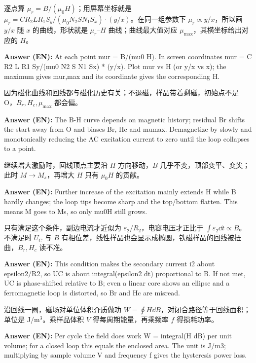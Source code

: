 \documentclass[11pt]{ctexart}
\begin{document}
逐点算 \(\mu_r=B/(\mu_0H)\)；用屏幕坐标就是 \(\mu_r=CR_2LR_1S_y/(\mu_0N_2SN_1S_x)\cdot(y/x)\)。在同一组参数下 \(\mu_r\propto y/x\)，所以画 \(y/x\) 随 \(x\) 的曲线，形状就是 \(\mu_r\)--\(H\) 曲线；曲线最大值对应 \(\mu_{\max}\)，其横坐标给出对应的 \(H\)。


\textbf{Answer (EN):} At each point mur = B/(mu0 H). In screen coordinates mur = C R2 L R1 Sy/(mu0 N2 S N1 Sx) * (y/x). Plot mur vs H (or y/x vs x); the maximum gives mur,max and its coordinate gives the corresponding H.

因为磁化曲线和回线都与磁化历史有关；不退磁，样品带着剩磁，初始点不是 O，\(B_r,H_c,\mu_{\max}\) 都会偏。

\textbf{Answer (EN):} The B-H curve depends on magnetic history; residual Br shifts the start away from O and biases Br, Hc and mumax. Demagnetize by slowly and monotonically reducing the AC excitation current to zero until the loop collapses to a point.

继续增大激励时，回线顶点主要沿 \(H\) 方向移动，\(B\) 几乎不变，顶部变平、变尖；此时 \(M\to M_s\)，再增大 \(H\) 只有 \(\mu_0H\) 的贡献。

\textbf{Answer (EN):} Further increase of the excitation mainly extends H while B hardly changes; the loop tips become sharp and the top/bottom flatten. This means M goes to Ms, so only mu0H still grows.

只有满足这个条件，副边电流才近似为 \(\varepsilon_2/R_2\)，电容电压才正比于 \(\int\varepsilon_2\dd t\propto B\)。不满足时 \(U_C\) 与 \(B\) 有相位差，线性样品也会显示成椭圆，铁磁样品的回线被扭曲，\(B_r,H_c\) 读不准。

\textbf{Answer (EN):} This condition makes the secondary current i2 about epsilon2/R2, so UC is about integral(epsilon2 dt) proportional to B. If not met, UC is phase-shifted relative to B; even a linear core shows an ellipse and a ferromagnetic loop is distorted, so Br and Hc are misread.

沿回线一圈，磁场对单位体积介质做功 \(W=\oint H\dd B\)，对闭合路径等于回线面积；单位是 \(\mathrm{J/m^3}\)。乘样品体积 \(V\) 得每周期能量，再乘频率 \(f\) 得损耗功率。

\textbf{Answer (EN):} Per cycle the field does work W = integral(H dB) per unit volume; for a closed loop this equals the enclosed area. The unit is J/m3; multiplying by sample volume V and frequency f gives the hysteresis power loss.
\end{document}
